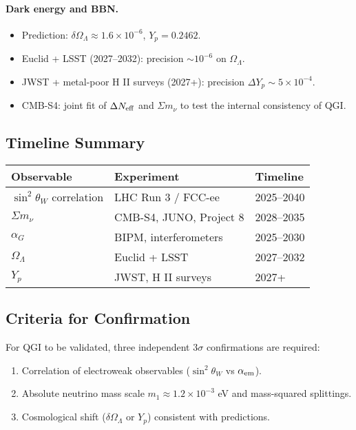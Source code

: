 \documentclass{article}
\numberwithin{equation}{section}
\theoremstyle{plain}
\theoremstyle{definition}
\theoremstyle{remark}
\begin{document}
\paragraph{Dark energy and BBN.}
\begin{itemize}
    \item Prediction: $\delta \Omega_\Lambda \approx 1.6 \times 10^{-6}$, $Y_p = 0.2462$.
    \item Euclid + LSST (2027--2032): precision $\sim 10^{-6}$ on $\Omega_\Lambda$.
    \item JWST + metal-poor H II surveys (2027+): precision $\Delta Y_p \sim 5\times 10^{-4}$.
    \item CMB-S4: joint fit of $\Delta N_{\rm eff}$ and $\Sigma m_\nu$ to test the internal consistency of QGI.
\end{itemize}

\subsection{Timeline Summary}
\begin{center}
\begin{tabular}{@{}lll@{}}
\toprule
\textbf{Observable} & \textbf{Experiment} & \textbf{Timeline} \\
\midrule
$\sin^2\theta_W$ correlation & LHC Run 3 / FCC-ee & 2025--2040 \\
$\Sigma m_\nu$ & CMB-S4, JUNO, Project 8 & 2028--2035 \\
$\alpha_G$ & BIPM, interferometers & 2025--2030 \\
$\Omega_\Lambda$ & Euclid + LSST & 2027--2032 \\
$Y_p$ & JWST, H II surveys & 2027+ \\
\bottomrule
\end{tabular}
\end{center}

\subsection{Criteria for Confirmation}
For QGI to be validated, three independent $3\sigma$ confirmations are required:
\begin{enumerate}
    \item Correlation of electroweak observables ($\sin^2\theta_W$ vs $\alpha_{\rm em}$).
    \item Absolute neutrino mass scale $m_1 \approx 1.2\times 10^{-3}$ eV and mass-squared splittings.
    \item Cosmological shift ($\delta\Omega_\Lambda$ or $Y_p$) consistent with predictions.
\end{enumerate}
\end{document}
